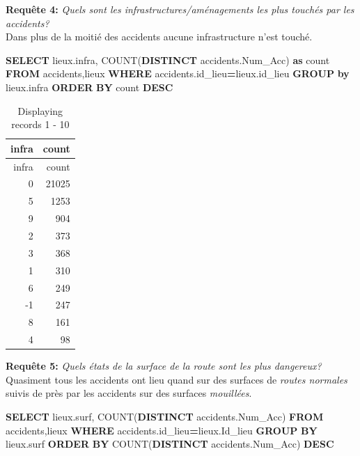 \documentclass[mstat,12pt]{unswthesis}
\newenvironment{Shaded}{\begin{snugshade}}{\end{snugshade}}
\newcommand{\FunctionTok}[1]{\textcolor[rgb]{0.00,0.00,0.00}{#1}}
\newcommand{\KeywordTok}[1]{\textcolor[rgb]{0.13,0.29,0.53}{\textbf{#1}}}
\newcommand{\NormalTok}[1]{#1}
\newcommand{\OperatorTok}[1]{\textcolor[rgb]{0.81,0.36,0.00}{\textbf{#1}}}
\begin{document}
\textbf{Requête 4:} \emph{Quels sont les infrastructures/aménagements
les plus touchés par les accidents?}\\
Dans plus de la moitié des accidents aucune infrastructure n'est touché.

\begin{Shaded}
\begin{Highlighting}[]
\KeywordTok{SELECT}\NormalTok{ lieux.infra, }\FunctionTok{COUNT}\NormalTok{(}\KeywordTok{DISTINCT}\NormalTok{ accidents.Num\_Acc) }\KeywordTok{as} \FunctionTok{count} 
\KeywordTok{FROM}\NormalTok{ accidents,lieux}
\KeywordTok{WHERE}\NormalTok{ accidents.id\_lieu}\OperatorTok{=}\NormalTok{lieux.id\_lieu}
\KeywordTok{GROUP} \KeywordTok{by}\NormalTok{ lieux.infra}
\KeywordTok{ORDER} \KeywordTok{BY} \FunctionTok{count} \KeywordTok{DESC}
\end{Highlighting}
\end{Shaded}

\begin{longtable}[]{@{}rr@{}}
\caption{Displaying records 1 - 10}\tabularnewline
\toprule()
infra & count \\
\midrule()
\endfirsthead
\toprule()
infra & count \\
\midrule()
\endhead
0 & 21025 \\
5 & 1253 \\
9 & 904 \\
2 & 373 \\
3 & 368 \\
1 & 310 \\
6 & 249 \\
-1 & 247 \\
8 & 161 \\
4 & 98 \\
\bottomrule()
\end{longtable}

\medskip

\textbf{Requête 5:} \emph{Quels états de la surface de la route sont les
plus dangereux?}\\
Quasiment tous les accidents ont lieu quand sur des surfaces de
\emph{routes normales} suivis de près par les accidents sur des surfaces
\emph{mouillées}.

\begin{Shaded}
\begin{Highlighting}[]
\KeywordTok{SELECT}\NormalTok{ lieux.surf, }\FunctionTok{COUNT}\NormalTok{(}\KeywordTok{DISTINCT}\NormalTok{ accidents.Num\_Acc) }
\KeywordTok{FROM}\NormalTok{ accidents,lieux }
\KeywordTok{WHERE}\NormalTok{ accidents.id\_lieu}\OperatorTok{=}\NormalTok{lieux.Id\_lieu }
\KeywordTok{GROUP} \KeywordTok{BY}\NormalTok{ lieux.surf }
\KeywordTok{ORDER} \KeywordTok{BY}\NormalTok{ \textasciigrave{}COUNT(}\KeywordTok{DISTINCT}\NormalTok{ accidents.Num\_Acc)\textasciigrave{} }\KeywordTok{DESC}
\end{Highlighting}
\end{Shaded}
\end{document}
